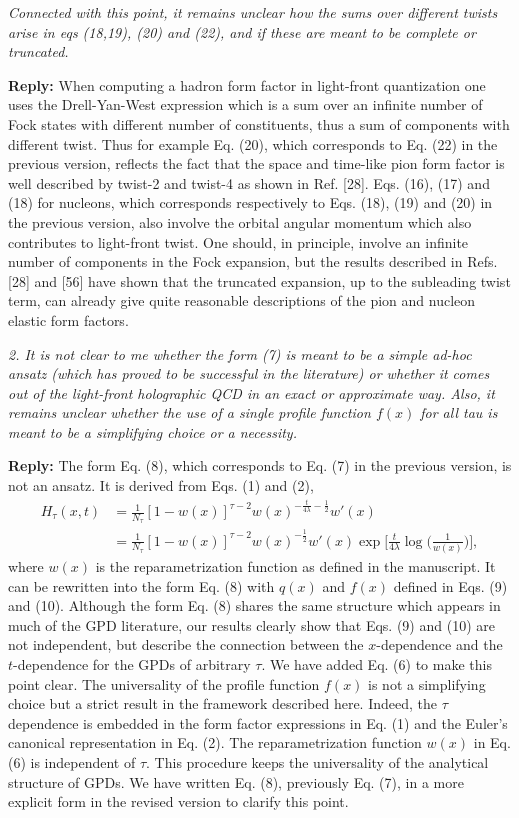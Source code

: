 \documentclass[12pt]{article}
\begin{document}
{\it Connected with this point, it remains unclear how the sums over
different twists arise in eqs (18,19), (20) and (22), and if these are
meant to be complete or truncated.}

{\bf Reply:} When computing a hadron form factor in light-front quantization one uses the Drell-Yan-West expression which is a sum over an infinite number of Fock states with different number of constituents, thus a sum of components with different twist.  Thus for example Eq. (20), which corresponds to Eq. (22) in the previous version,  reflects the fact that the space and time-like pion form factor is well described by twist-2 and twist-4 as shown in Ref. [28]. Eqs. (16), (17) and (18) for nucleons, which corresponds respectively to Eqs. (18), (19) and (20) in the previous version, also involve the orbital angular momentum which also contributes to light-front twist. One should, in principle, involve an infinite number of components in the Fock expansion,  but the results described in Refs. [28] and  [56] have shown that the truncated expansion, up to the subleading twist term, can already give quite reasonable descriptions of the pion and nucleon elastic form factors.


{\it 2. It is not clear to me whether the form (7) is meant to be a simple
ad-hoc ansatz (which has proved to be successful in the literature) or
whether it comes out of the light-front holographic QCD in an exact or
approximate way. Also, it remains unclear whether the use of a single
profile function $f(x)$ for all tau is meant to be a simplifying choice
or a necessity.}


{\bf Reply:} The form  Eq. (8), which corresponds to Eq. (7) in the previous version, is not an ansatz. It is derived from Eqs. (1) and (2),
\begin{align*}
H_\tau(x,t)&=\frac{1}{N_\tau}[1-w(x)]^{\tau-2}w(x)^{-\frac{t}{4\lambda}-\frac{1}{2}}w'(x)\\
&=\frac{1}{N_\tau}[1-w(x)]^{\tau-2}w(x)^{-\frac{1}{2}}w'(x)\exp\Big[\frac{t}{4\lambda}\log\Big(\frac{1}{w(x)}\Big)\Big],
\end{align*}
where $w(x)$ is the reparametrization function as defined in the manuscript. It can be rewritten into the form Eq. (8) with $q(x)$ and $f(x)$ defined in Eqs. (9) and (10). Although the form Eq.  (8) shares the same structure which appears in much of the GPD  literature, our results clearly show that Eqs.  (9) and (10) are not independent, but describe the connection  between the $x$-dependence and the $t$-dependence for the GPDs of arbitrary $\tau$. We have added  Eq. (6) to make this point clear. The universality of the profile function $f(x)$ is not a  simplifying choice but a strict result in the framework described here. Indeed,  the $\tau$ dependence is embedded in the form factor expressions in Eq. (1) and the Euler's canonical representation in Eq. (2). The reparametrization function $ w(x)$ in Eq. (6) is independent  of $\tau$.  This procedure keeps the universality of the analytical structure of GPDs.  We have written Eq. (8), previously Eq. (7), in a more explicit form in the revised version to clarify this point.
\end{document}
